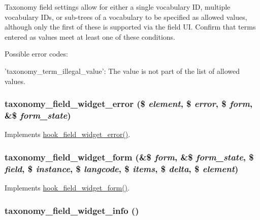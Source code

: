 Taxonomy field settings allow for either a single vocabulary ID, multiple vocabulary IDs, or sub-\/trees of a vocabulary to be specified as allowed values, although only the first of these is supported via the field UI. Confirm that terms entered as values meet at least one of these conditions.

Possible error codes:
\begin{DoxyItemize}
\item 'taxonomy\_\-term\_\-illegal\_\-value': The value is not part of the list of allowed values. 
\end{DoxyItemize}\hypertarget{taxonomy_8module_af0c0026c27179a8e8f4b933b85cda307}{
\subsubsection[{taxonomy\_\-field\_\-widget\_\-error}]{\setlength{\rightskip}{0pt plus 5cm}taxonomy\_\-field\_\-widget\_\-error (\$ {\em element}, \/  \$ {\em error}, \/  \$ {\em form}, \/  \&\$ {\em form\_\-state})}}
\label{taxonomy_8module_af0c0026c27179a8e8f4b933b85cda307}
Implements \hyperlink{group__field__widget_ga9a2031578542fef9e296d79c946431fd}{hook\_\-field\_\-widget\_\-error()}. \hypertarget{taxonomy_8module_a05c9187ec859f3b715af290fec4d77db}{
\subsubsection[{taxonomy\_\-field\_\-widget\_\-form}]{\setlength{\rightskip}{0pt plus 5cm}taxonomy\_\-field\_\-widget\_\-form (\&\$ {\em form}, \/  \&\$ {\em form\_\-state}, \/  \$ {\em field}, \/  \$ {\em instance}, \/  \$ {\em langcode}, \/  \$ {\em items}, \/  \$ {\em delta}, \/  \$ {\em element})}}
\label{taxonomy_8module_a05c9187ec859f3b715af290fec4d77db}
Implements \hyperlink{group__field__widget_gaa9b0e55fd0eb57ac0f9c7c30d251971b}{hook\_\-field\_\-widget\_\-form()}. \hypertarget{taxonomy_8module_ad6d45fa8106c7ee50059ebf9e89b9268}{
\subsubsection[{taxonomy\_\-field\_\-widget\_\-info}]{\setlength{\rightskip}{0pt plus 5cm}taxonomy\_\-field\_\-widget\_\-info ()}}
